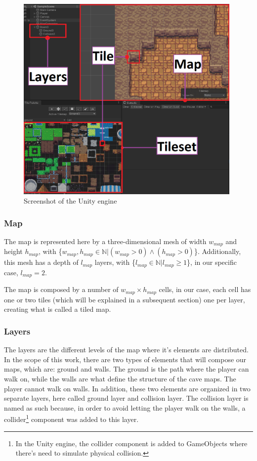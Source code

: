 \begin{figure}[h]
    \caption{Screenshot of the Unity engine}
    \centerline{\includegraphics[width=11cm]{images/proposal/unity_print.png}}
    \label{fig:unity_print}
\end{figure}

\subsubsection{Map}
The map is represented here by a three-dimensional mesh of width \(w_{map}\) and height \(h_{map}\), with \{\(w_{map}, h_{map} \in \mathbb{N}|(w_{map}>0)\wedge(h_{map}>0)\)\}. Additionally, this mesh has a depth of \(l_{map}\) layers, with \{\(l_{map} \in \mathbb{N}|l_{map}\geq 1\)\}, in our specific case, \(l_{map} = 2\).

The map is composed by a number of \(w_{map} \times h_{map}\) cells, in our case, each cell has one or two tiles (which will be explained in a subsequent section) one per layer, creating what is called a tiled map. 

\subsubsection{Layers}
The layers are the different levels of the map where it's elements are distributed. In the scope of this work, there are two types of elements that will compose our maps, which are: ground and walls. The ground is the path where the player can walk on, while the walls are what define the structure of the cave maps. The player cannot walk on walls. In addition, these two elements are organized in two separate layers, here called ground layer and collision layer. The collision layer is named as such because, in order to avoid letting the player walk on the walls, a collider\footnote{In the Unity engine, the collider component is added to GameObjects where there's need to simulate physical collision.} component was added to this layer.

